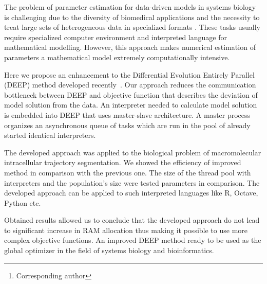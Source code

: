 \documentclass[12pt, a4paper]{article} %
\begin{document}

\renewcommand{\abstractname}{\large \textbf{\uppercase{
    Deep: optimizer with embedded interpreter\\
}}}
\begin{abstract}
    \normalsize %
    \bigskip %
    \noindent A.~V.~Svichkarev\footnote[*]{Corresponding author}, K.~N.~Kozlov \\
    \noindent
    System biology and bioinformatics lab, IAMM,
    Peter the Great St.Petersburg Polytechnic University,
St.Petersburg, Russia \\
    \noindent e-mail: tolik0393@bionet.nsc.ru \\
\end{abstract}

The problem of parameter estimation
for data-driven models in systems biology
is challenging due to the diversity
of biomedical applications and
the necessity to treat large sets of
heterogeneous data in specialized formats \cite{mendes1998non}.
These tasks usually require
specialized computer environment
and interpreted language for
mathematical modelling.
However, this approach makes
numerical estimation of parameters
a mathematical model
extremely computationally intensive.

Here we propose
an enhancement to the
Differential Evolution Entirely Parallel (DEEP) method
developed recently~\cite{Kozlov11}.
Our approach reduces the
communication bottleneck
between DEEP and objective function
that describes the deviation
of model solution
from the data.
An interpreter needed to
calculate model solution
is embedded into
DEEP that uses
master-slave architecture.
A master process
organizes an asynchronous queue
of tasks which are run
in the pool of
already started identical interpreters.

The developed approach was
applied to the biological problem
of macromolecular intracellular
trajectory segmentation.
We showed the efficiency of improved method
in comparison with the previous one.
The size of the thread pool
with interpreters and
the population's size
were tested parameters
in comparison.
The developed approach can be applied to
such interpreted languages like
R, Octave, Python etc.

Obtained results allowed us
to conclude that
the developed approach
do not lead to significant increase
in RAM allocation thus making
it possible to use
more complex objective functions.
An improved DEEP method ready
to be used as the global optimizer
in the field of systems biology
and bioinformatics.

\vfill %
\end{document}
